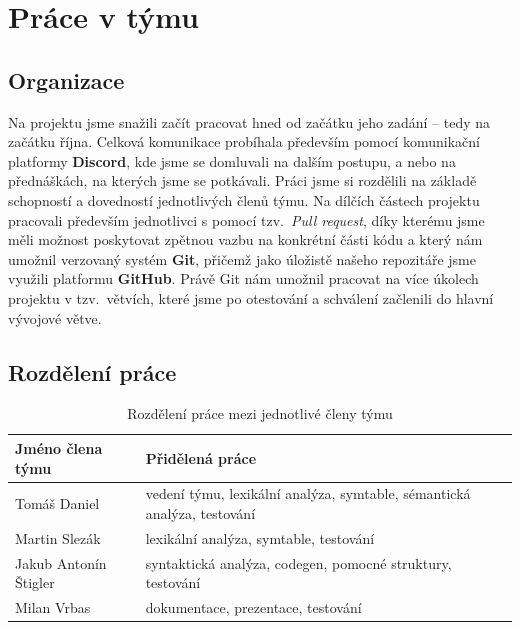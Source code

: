 \documentclass[a4paper, 12pt]{article} %
\begin{document}
    \newpage
    \section{Práce v týmu}
        \subsection{Organizace}
            Na projektu jsme snažili začít pracovat hned od začátku jeho zadání -- tedy
            na začátku října. Celková komunikace probíhala především pomocí komunikační
            platformy \textbf{Discord}, kde jsme se domluvali na dalším postupu, a nebo 
            na přednáškách, na kterých jsme se potkávali. Práci jsme si rozdělili na 
            základě schopností a dovedností jednotlivých členů týmu. Na dílčích částech
            projektu pracovali především jednotlivci s pomocí tzv.\ \textit{Pull request}, 
            díky kterému jsme měli možnost poskytovat zpětnou vazbu na konkrétní části kódu 
            a který nám umožnil verzovaný systém \textbf{Git}, přičemž jako úložistě 
            našeho repozitáře jsme využili platformu \textbf{GitHub}. Právě Git nám umožnil
            pracovat na více úkolech projektu v tzv.\ větvích, které jsme po otestování a 
            schválení začlenili do hlavní vývojové větve.

        \subsection{Rozdělení práce}            
            \begin{table}[htbp]
                \centering
                \begin{tabular}{| l | l |}
                    \hline
                    \textbf{Jméno člena týmu} & \textbf{Přidělená práce} \\
                    \hline
                    Tomáš Daniel            &  vedení týmu, lexikální analýza, symtable, sémantická 
                                                analýza, testování\\
                    Martin Slezák           &  lexikální analýza, symtable, testování\\
                    Jakub Antonín Štigler   &  syntaktická analýza, codegen, pomocné struktury, testování\\
                    Milan Vrbas             &  dokumentace, prezentace, testování \\
                    \hline
                \end{tabular}
                \caption{Rozdělení práce mezi jednotlivé členy týmu}
            \end{table}
\end{document}
